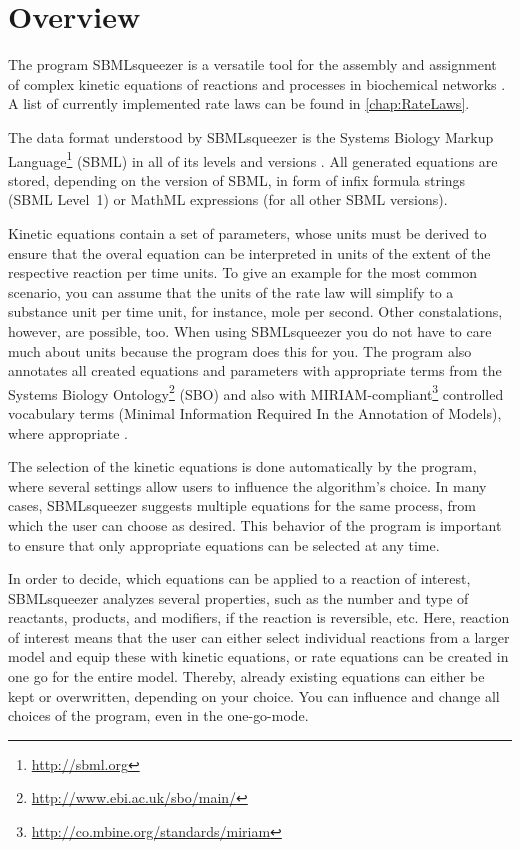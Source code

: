 \chapter{Overview}

The program SBMLsqueezer is a versatile tool for the assembly and assignment of
complex kinetic equations of reactions and processes in biochemical networks
\citep{Draeger2008, Draeger2010a, Draeger2011a}.
A list of currently implemented rate laws can be found in 
\vref{chap:RateLaws}.

The data format understood by SBMLsqueezer is the Systems Biology Markup
Language\footnote{\url{http://sbml.org}} (SBML) in all of its levels and
versions \citep{Hucka2001, Hucka2003, M.Hucka03012003, Hucka2007, Hucka2008,
Hucka2010a, Finney2003, Finney2006}.
All generated equations are stored, depending on the version of SBML, in form of
infix formula strings (SBML Level~1) or MathML \citep{Buswell1999} expressions
(for all other SBML versions).

Kinetic equations contain a set of parameters, whose units must be derived to
ensure that the overal equation can be interpreted in units of the extent of the
respective reaction per time units.
To give an example for the most common scenario, you can assume that the units
of the rate law will simplify to a substance unit per time unit, for instance,
mole per second.
Other constalations, however, are possible, too.
When using SBMLsqueezer you do not have to care much about units because the
program does this for you.
The program also annotates all created equations and parameters with appropriate
terms from the Systems Biology 
Ontology\footnote{\url{http://www.ebi.ac.uk/sbo/main/}} (SBO) and also
with MIRIAM-compliant\footnote{\url{http://co.mbine.org/standards/miriam}}
controlled vocabulary terms (Minimal Information Required In the Annotation of
Models), where appropriate \citep{Le2005, Novere2006b,
Laible2007, Courtot2011}.

The selection of the kinetic equations is done automatically by the program,
where several settings allow users to influence the algorithm's choice.
In many cases, SBMLsqueezer suggests multiple equations for the same process,
from which the user can choose as desired.
This behavior of the program is important to ensure that only appropriate
equations can be selected at any time.

In order to decide, which equations can be applied to a reaction of interest,
SBMLsqueezer analyzes several properties, such as the number and type of
reactants, products, and modifiers, if the reaction is reversible, etc.
Here, reaction of interest means that the user can either select individual
reactions from a larger model and equip these with kinetic equations, or rate
equations can be created in one go for the entire model.
Thereby, already existing equations can either be kept or overwritten, depending
on your choice.
You can influence and change all choices of the program, even in the one-go-mode.

